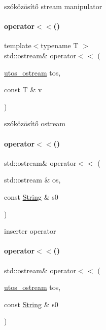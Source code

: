 szóközösítő stream manipulator 

\mbox{\label{schtring_8hpp_a89c0d4114f2a28d8ba3812f91ac3d0d2}} 
\paragraph{\texorpdfstring{operator$<$$<$()}{operator<<()}\hspace{0.1cm}{\footnotesize\ttfamily [2/4]}}
{\footnotesize\ttfamily template$<$typename T $>$ \\
std\+::ostream\& operator$<$$<$ (\begin{DoxyParamCaption}\item[{\mbox{\hyperlink{structutos__ostream}{utos\+\_\+ostream}}}]{tos,  }\item[{const T \&}]{v }\end{DoxyParamCaption})}



szóközösítő ostream 

\mbox{\label{schtring_8hpp_aef14876e55f43fb4ffa7b91664467ecb}} 
\paragraph{\texorpdfstring{operator$<$$<$()}{operator<<()}\hspace{0.1cm}{\footnotesize\ttfamily [3/4]}}
{\footnotesize\ttfamily std\+::ostream\& operator$<$$<$ (\begin{DoxyParamCaption}\item[{std\+::ostream \&}]{os,  }\item[{const \mbox{\hyperlink{class_string}{String}} \&}]{s0 }\end{DoxyParamCaption})}



inserter operator 

\mbox{\label{schtring_8hpp_a06c0f45780d45c035c1eabecbb34198d}} 
\paragraph{\texorpdfstring{operator$<$$<$()}{operator<<()}\hspace{0.1cm}{\footnotesize\ttfamily [4/4]}}
{\footnotesize\ttfamily std\+::ostream\& operator$<$$<$ (\begin{DoxyParamCaption}\item[{\mbox{\hyperlink{structutos__ostream}{utos\+\_\+ostream}}}]{tos,  }\item[{const \mbox{\hyperlink{class_string}{String}} \&}]{s0 }\end{DoxyParamCaption})}



